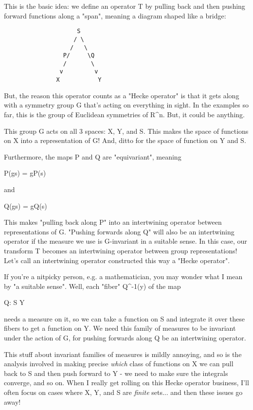 This is the basic idea: we define an operator T by pulling
back and then pushing forward functions along a "span", meaning
a diagram shaped like a bridge:

\begin{verbatim}
                     S
                    / \
                   /   \
                 P/     \Q
                 /       \
                v         v 
               X           Y
\end{verbatim}
    
But, the reason this operator counts as a "Hecke operator" 
is that it gets along with a symmetry group G that's acting 
on everything in sight.  In the examples so far, this is 
the group of Euclidean symmetries of R^{n}.  But, it could be
anything.  

This group G acts on all 3 spaces: X, Y, and S.  This makes the 
space of functions on X into a representation of G!  And, ditto 
for the space of function on Y and S.

Furthermore, the maps P and Q are "equivariant", meaning

P(gs) = gP(s)

and

Q(gs) = gQ(s)

This makes "pulling back along P" into an intertwining operator
between representations of G.  "Pushing forwards along Q" will
also be an intertwining operator if the measure we use is 
G-invariant in a suitable sense.  In this case, our transform T 
becomes an intertwining operator between group representations!  
Let's call an intertwining operator constructed this way a "Hecke 
operator".

If you're a nitpicky person, e.g. a mathematician, you may wonder what
I mean by "a suitable sense".  Well, each "fiber"
Q^{-1}(y) of the map

Q: S \to  Y

needs a measure on it, so we can take a function on S and 
integrate it over these fibers to get a function on Y.   We need 
this family of measures to be invariant under the action of G, 
for pushing forwards along Q be an intertwining operator.

This stuff about invariant families of measures is mildly 
annoying, and so is the analysis involved in making precise 
\emph{which} class of functions on X we can pull back to S and then 
push forward to Y - we need to make sure the integrals converge, 
and so on.  When I really get rolling on this Hecke operator 
business, I'll often focus on cases where X, Y, and S are 
\emph{finite} sets... and then these issues go away!

